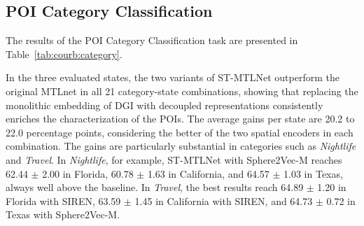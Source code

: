 \subsection{POI Category Classification}

The results of the POI Category Classification task are presented in Table~\ref{tab:courb:category}.

In the three evaluated states, the two variants of ST-MTLNet outperform the original MTLnet in all 21 category-state combinations, showing that replacing the monolithic embedding of DGI with decoupled representations consistently enriches the characterization of the POIs. The average gains per state are 20.2 to 22.0 percentage points, considering the better of the two spatial encoders in each combination. The gains are particularly substantial in categories such as \textit{Nightlife} and \textit{Travel}. In \textit{Nightlife}, for example, ST-MTLNet with Sphere2Vec-M reaches 62.44 $\pm$ 2.00 in Florida, 60.78 $\pm$ 1.63 in California, and 64.57 $\pm$ 1.03 in Texas, always well above the baseline. In \textit{Travel}, the best results reach 64.89 $\pm$ 1.20 in Florida with SIREN, 63.59 $\pm$ 1.45 in California with SIREN, and 64.73 $\pm$ 0.72 in Texas with Sphere2Vec-M.



